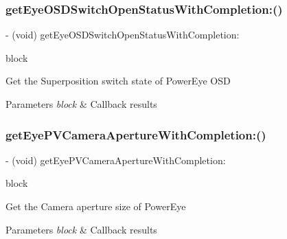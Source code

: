 \subsubsection{\texorpdfstring{get\+Eye\+O\+S\+D\+Switch\+Open\+Status\+With\+Completion\+:()}{getEyeOSDSwitchOpenStatusWithCompletion:()}}
{\footnotesize\ttfamily -\/ (void) get\+Eye\+O\+S\+D\+Switch\+Open\+Status\+With\+Completion\+: \begin{DoxyParamCaption}\item[{(void($^\wedge$)(P\+V\+Eye\+O\+S\+D\+Switch\+State state, N\+S\+Error $\ast$\hyperlink{group___p_v_s_d_k___c_o_r_e___a_p_i___m_o_u_n_t_c_o_n_t_r_o_l_ga5a1de33b230662127568783314b4a54d}{\+\_\+\+Nullable} error))}]{block }\end{DoxyParamCaption}}

Get the Superposition switch state of Power\+Eye O\+SD


\begin{DoxyParams}{Parameters}
{\em block} & Callback results \\
\hline
\end{DoxyParams}
\mbox{\label{interface_p_v_camera_a537a827fa162853c04b22aee72f2e295}} 
\subsubsection{\texorpdfstring{get\+Eye\+P\+V\+Camera\+Aperture\+With\+Completion\+:()}{getEyePVCameraApertureWithCompletion:()}}
{\footnotesize\ttfamily -\/ (void) get\+Eye\+P\+V\+Camera\+Aperture\+With\+Completion\+: \begin{DoxyParamCaption}\item[{(void($^\wedge$)(P\+V\+Camera\+Aperture aperture, N\+S\+Error $\ast$\hyperlink{group___p_v_s_d_k___c_o_r_e___a_p_i___m_o_u_n_t_c_o_n_t_r_o_l_ga5a1de33b230662127568783314b4a54d}{\+\_\+\+Nullable} error))}]{block }\end{DoxyParamCaption}}

Get the Camera aperture size of Power\+Eye


\begin{DoxyParams}{Parameters}
{\em block} & Callback results \\
\hline
\end{DoxyParams}
\mbox{\label{interface_p_v_camera_ad5f62d0984dd1278d2364135afc7bb6d}} 
